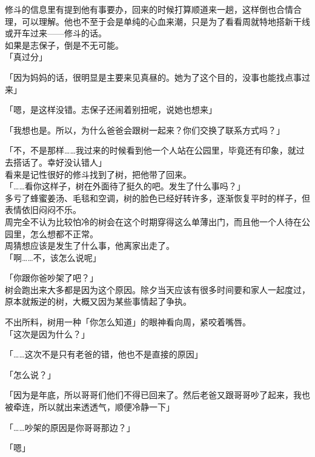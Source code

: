修斗的信息里有提到他有事要办，回来的时候打算顺道来一趟，这样倒也合情合理，可以理解。他也不至于会是单纯的心血来潮，只是为了看看周就特地搭新干线或开车过来——修斗的话。\\

如果是志保子，倒是不无可能。\\

「真过分」

「因为妈妈的话，很明显是主要来见真昼的。她为了这个目的，没事也能找点事过来」

「嗯，是这样没错。志保子还闹着别扭呢，说她也想来」

「我想也是。所以，为什么爸爸会跟树一起来？你们交换了联系方式吗？」

「不，不是那样……我过来的时候看到他一个人站在公园里，毕竟还有印象，就过去搭话了。幸好没认错人」\\

看来是记性很好的修斗找到了树，把他带了回来。\\

「……看你这样子，树在外面待了挺久的吧。发生了什么事吗？」\\

多亏了蜂蜜姜汤、毛毯和空调，树的脸色已经好转许多，逐渐恢复平时的样子，但表情依旧闷闷不乐。\\

周完全不认为比较怕冷的树会在这个时期穿得这么单薄出门，而且他一个人待在公园里，怎么想都不正常。\\

周猜想应该是发生了什么事，他离家出走了。\\

「啊……不，该怎么说呢」

「你跟你爸吵架了吧？」\\

树会跑出来大多都是因为这个原因。除夕当天应该有很多时间要和家人一起度过，原本就叛逆的树，大概又因为某些事情起了争执。

不出所料，树用一种「你怎么知道」的眼神看向周，紧咬着嘴唇。\\

「这次是因为什么？」

「……这次不是只有老爸的错，他也不是直接的原因」

「怎么说？」

「因为是年底，所以哥哥们他们不得已回来了。然后老爸又跟哥哥吵了起来，我也被牵连，所以就出来透透气，顺便冷静一下」

「……吵架的原因是你哥哥那边？」

「嗯」\\

